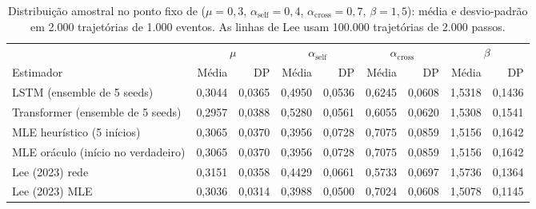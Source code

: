 \begin{table}[htbp]
\centering
\caption{Distribuição amostral no ponto fixo de \citet{lee2023} ($\mu=0{,}3$, $\alpha_{\mathrm{self}}=0{,}4$, $\alpha_{\mathrm{cross}}=0{,}7$, $\beta=1{,}5$): média e desvio-padrão em 2.000 trajetórias de 1.000 eventos. As linhas de Lee usam 100.000 trajetórias de 2.000 passos.}
\label{tab:e2-ponto-fixo}
\scriptsize
\begin{tabular}{lrrrrrrrr}
\toprule
 & \multicolumn{2}{c}{$\mu$} & \multicolumn{2}{c}{$\alpha_{\mathrm{self}}$} & \multicolumn{2}{c}{$\alpha_{\mathrm{cross}}$} & \multicolumn{2}{c}{$\beta$}\\
Estimador & Média & DP & Média & DP & Média & DP & Média & DP\\
\midrule
LSTM (ensemble de 5 seeds) & 0,3044 & 0,0365 & 0,4950 & 0,0536 & 0,6245 & 0,0608 & 1,5318 & 0,1436\\
Transformer (ensemble de 5 seeds) & 0,2957 & 0,0388 & 0,5280 & 0,0561 & 0,6055 & 0,0620 & 1,5308 & 0,1541\\
MLE heurístico (5 inícios) & 0,3065 & 0,0370 & 0,3956 & 0,0728 & 0,7075 & 0,0859 & 1,5156 & 0,1642\\
MLE oráculo (início no verdadeiro) & 0,3065 & 0,0370 & 0,3956 & 0,0728 & 0,7075 & 0,0859 & 1,5156 & 0,1642\\
Lee (2023) rede & 0,3151 & 0,0358 & 0,4429 & 0,0661 & 0,5733 & 0,0697 & 1,5736 & 0,1364\\
Lee (2023) MLE & 0,3036 & 0,0314 & 0,3988 & 0,0500 & 0,7024 & 0,0608 & 1,5078 & 0,1145\\
\bottomrule
\end{tabular}
\end{table}
